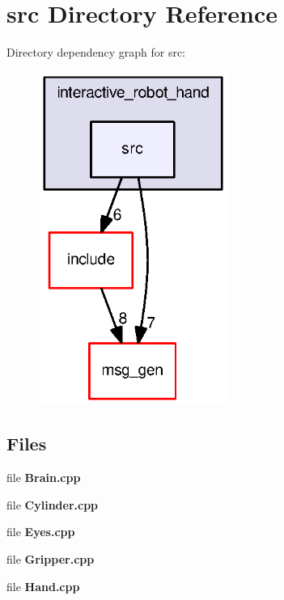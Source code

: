 \section{src Directory Reference}
\label{dir_34df673508a04c0641bb468aed6919eb}
Directory dependency graph for src\-:
\nopagebreak
\begin{figure}[H]
\begin{center}
\leavevmode
\includegraphics[width=175pt]{dir_34df673508a04c0641bb468aed6919eb_dep}
\end{center}
\end{figure}
\subsection*{Files}
\begin{DoxyCompactItemize}
\item 
file {\bf Brain.\-cpp}
\item 
file {\bf Cylinder.\-cpp}
\item 
file {\bf Eyes.\-cpp}
\item 
file {\bf Gripper.\-cpp}
\item 
file {\bf Hand.\-cpp}
\end{DoxyCompactItemize}
